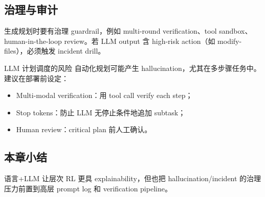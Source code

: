 \subsection{治理与审计}

生成规划时要有治理 guardrail，例如 multi-round verification、tool sandbox、human-in-the-loop review。若 LLM output 含 high-risk action（如 modify-files），必须触发 incident drill。

\begin{warningbox}{LLM 计划调度的风险}
自动化规划可能产生 hallucination，尤其在多步骤任务中。建议在部署前设定：
\begin{itemize}
    \item Multi-modal verification：用 tool call verify each step；
    \item Stop tokens：防止 LLM 无停止条件地追加 subtask；
    \item Human review：critical plan 前人工确认。
\end{itemize}
\end{warningbox}

\subsection{本章小结}

语言+LLM 让层次 RL 更具 explainability，但也把 hallucination/incident 的治理压力前置到高层 prompt log 和 verification pipeline。

